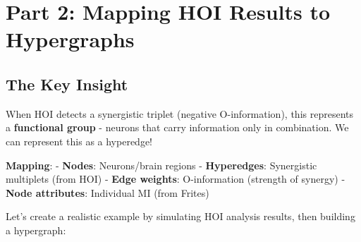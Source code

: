 \documentclass[
  11pt,
  letterpaper,
  oneside,
  openany]{book}
\begin{document}
\section{Part 2: Mapping HOI Results to
Hypergraphs}\label{part-2-mapping-hoi-results-to-hypergraphs}

\subsection{The Key Insight}\label{the-key-insight}

When HOI detects a synergistic triplet (negative O-information), this
represents a \textbf{functional group} - neurons that carry information
only in combination. We can represent this as a hyperedge!

\textbf{Mapping}: - \textbf{Nodes}: Neurons/brain regions -
\textbf{Hyperedges}: Synergistic multiplets (from HOI) - \textbf{Edge
weights}: \textbar O-information\textbar{} (strength of synergy) -
\textbf{Node attributes}: Individual MI (from Frites)

Let's create a realistic example by simulating HOI analysis results,
then building a hypergraph:
\end{document}

